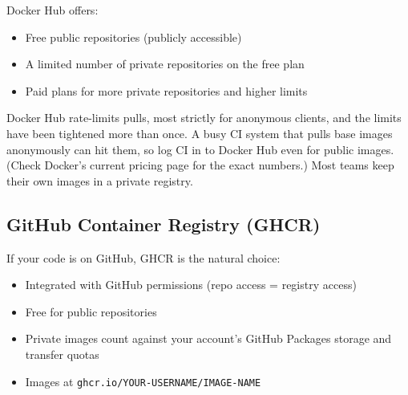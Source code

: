 \begin{codebox}[short]

\begin{Shaded}
\begin{Highlighting}[]
\end{Highlighting}
\end{Shaded}

\end{codebox}

\noindent{}Docker Hub offers:

\begin{itemize}
\tightlist
\item
  Free public repositories (publicly accessible)
\item
  A limited number of private repositories on the free plan
\item
  Paid plans for more private repositories and higher limits
\end{itemize}

\noindent{}Docker Hub rate-limits pulls, most strictly for anonymous clients, and the limits have been tightened more than once. A busy CI system that pulls base images anonymously can hit them, so log CI in to Docker Hub even for public images. (Check Docker's current pricing page for the exact numbers.) Most teams keep their own images in a private registry.

\subsection*{GitHub Container Registry (GHCR)}\label{19-artifact-storage:github-container-registry-ghcr}

If your code is on GitHub, GHCR is the natural choice:

\begin{itemize}
\tightlist
\item
  Integrated with GitHub permissions (repo access = registry access)
\item
  Free for public repositories
\item
  Private images count against your account's GitHub Packages storage and transfer quotas
\item
  Images at \texttt{ghcr.}\allowbreak{}\texttt{io/}\allowbreak{}\texttt{YOUR-}\allowbreak{}\texttt{USERNAME/}\allowbreak{}\texttt{IMAGE-}\allowbreak{}\texttt{NAME}
\end{itemize}

